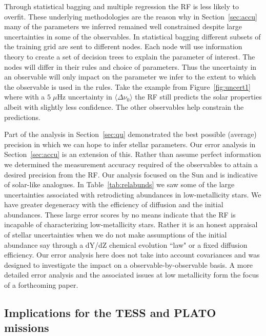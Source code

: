 Through statistical bagging and multiple regression the RF is less likely to overfit. %
These underlying methodologies are the reason why in Section~\ref{sec:accu} many of the parameters we inferred remained well constrained despite large uncertainties in some of the observables.   
In statistical bagging different subsets of the training grid are sent to different nodes. Each node will use information theory to create a set of decision trees to explain the parameter of interest. The nodes will differ in their rules and choice of parameters. Thus the uncertainty in an observable will only impact on the parameter we infer to the extent to which the observable is used in the rules.  
Take the example from Figure~\ref{fig:uncert1} where with a ${5\;\mu}$Hz uncertainty in ${\langle\Delta\nu_0\rangle}$ the RF still predicts the solar properties albeit with slightly less confidence.
The other observables help constrain the predictions. 

Part of the analysis in Section~\ref{sec:qu} demonstrated the best possible (average) precision in which we can hope to infer stellar parameters. Our error analysis in Section~\ref{sec:accu} is an extension of this. Rather than assume perfect information we determined  
 the measurement accuracy required of the observables to attain a desired precision from the RF.
Our analysis focused on the Sun and is indicative of solar-like analogues.
In Table~\ref{tab:relabunds} we saw some of the large uncertainties associated with retrodicting abundances in low-metallicity stars. We have greater degeneracy with the efficiency of diffusion and the initial abundances. These large error scores by no means indicate that the RF is incapable of characterizing low-metallicity stars. Rather it is an honest appraisal of stellar uncertainties when we do not make assumptions of the initial abundance say through a dY/dZ  chemical evolution ``law"  or a fixed diffusion efficiency. Our error analysis here does not take into account covariances and was designed to investigate the impact on a observable-by-observable basis.
A more detailed error analysis and the associated issues at low metallicity form the focus of a forthcoming paper.  


\subsection{Implications for the TESS and PLATO missions}

